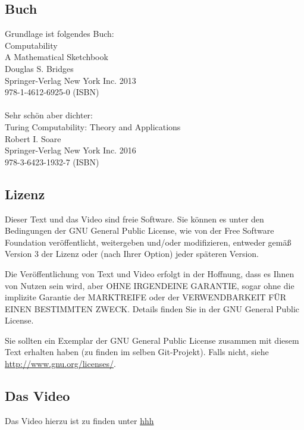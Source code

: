 \documentclass[a4paper]{amsart}
\theoremstyle{definition}
\begin{document}
\subsection*{Buch}
Grundlage ist folgendes Buch:\\
Computability\\
A Mathematical Sketchbook\\
Douglas S. Bridges\\
Springer-Verlag New York Inc. 2013\\
978-1-4612-6925-0 (ISBN)
\\
\\
Sehr schön aber dichter:\\
Turing Computability: Theory and Applications\\
Robert I. Soare\\
Springer-Verlag New York Inc. 2016\\
978-3-6423-1932-7 (ISBN)

\subsection*{Lizenz}
Dieser Text und das Video sind freie Software. Sie können es unter den Bedingungen der
GNU General Public License, wie von der Free Software Foundation veröffentlicht, weitergeben
und/oder modifizieren, entweder gemäß Version 3 der Lizenz oder (nach Ihrer Option) jeder späteren Version.

Die Veröffentlichung von Text und Video erfolgt in der Hoffnung, dass es Ihnen von Nutzen sein wird,
aber OHNE IRGENDEINE GARANTIE, sogar ohne die implizite Garantie der MARKTREIFE oder der
VERWENDBARKEIT FÜR EINEN BESTIMMTEN ZWECK. Details finden Sie in der GNU General Public License.

Sie sollten ein Exemplar der GNU General Public License zusammen mit diesem Text erhalten haben
(zu finden im selben Git-Projekt).
Falls nicht, siehe \url{http://www.gnu.org/licenses/}.

\subsection*{Das Video}
Das Video hierzu ist zu finden unter
{\tiny
   \url{hhh}
}
\end{document}
